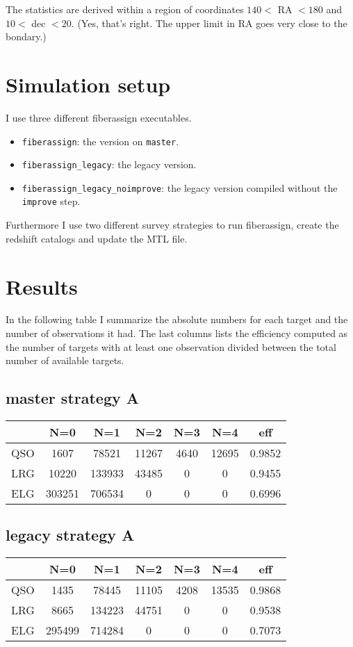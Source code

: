 \documentclass{article}
\begin{document}
The statistics are derived within a region of coordinates 
$140<$ RA $<180$ and
$10<$ dec $<20$. (Yes, that's right. The upper limit in RA goes very
close to the bondary.)

\section{Simulation setup}

I use three different fiberassign executables.
\begin{itemize}
\item \verb"fiberassign": the version on \verb'master'.
\item \verb"fiberassign_legacy": the legacy version.
\item \verb'fiberassign_legacy_noimprove': the legacy version compiled
without the \verb'improve' step.
\end{itemize}

Furthermore I use two different survey strategies to run fiberassign, 
create the redshift catalogs and update the MTL file.

\section{Results}

In the following table I summarize the absolute numbers for 
each target and the number of observations it had. The last columns
lists the efficiency computed as the number of targets with at least
one observation divided between the total number of available targets.

\subsection*{master strategy A}
\begin{center}
\begin{tabular}{l|ccccc|c}
 & N=0 & N=1 & N=2 & N=3 & N=4 & eff\\\hline
QSO & 1607 & 78521 & 11267 & 4640 & 12695 & 0.9852\\
LRG & 10220 & 133933 & 43485 & 0 & 0 &  0.9455\\
ELG & 303251& 706534 & 0& 0 & 0 & 0.6996
\end{tabular}
\end{center}

\subsection*{legacy strategy A}
\begin{center}
\begin{tabular}{l|ccccc|c}
 & N=0 & N=1 & N=2 & N=3 & N=4 & eff\\\hline
QSO & 1435& 78445& 11105& 4208& 13535 &  0.9868\\
LRG & 8665& 134223& 44751& 0& 0& 0.9538\\
ELG & 295499& 714284& 0& 0& 0 & 0.7073\\
\end{tabular}
\end{center}
\end{document}
